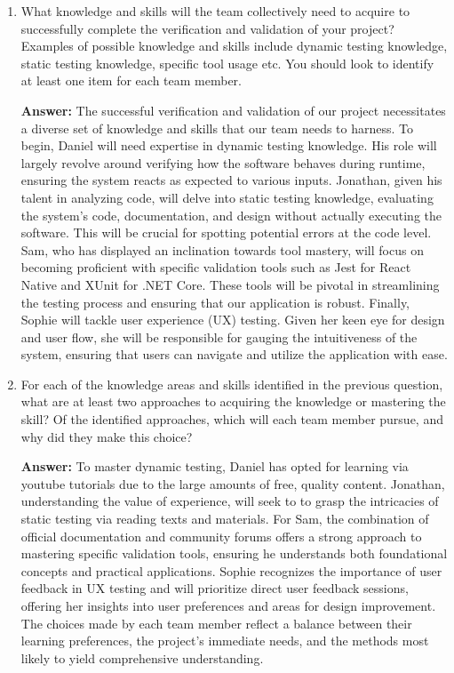 \documentclass[12pt, titlepage]{article}
\begin{document}
\begin{enumerate}
  \item What knowledge and skills will the team collectively need to acquire to successfully complete the verification and validation of your project? Examples of possible knowledge and skills include dynamic testing knowledge, static testing knowledge, specific tool usage etc. You should look to identify at least one item for each team member.

  \textbf{Answer:}
  The successful verification and validation of our project necessitates a diverse set of knowledge and skills that our team needs to harness. To begin, Daniel will need expertise in dynamic testing knowledge. His role will largely revolve around verifying how the software behaves during runtime, ensuring the system reacts as expected to various inputs. Jonathan, given his talent in analyzing code, will delve into static testing knowledge, evaluating the system's code, documentation, and design without actually executing the software. This will be crucial for spotting potential errors at the code level. Sam, who has displayed an inclination towards tool mastery, will focus on becoming proficient with specific validation tools such as Jest for React Native and XUnit for .NET Core. These tools will be pivotal in streamlining the testing process and ensuring that our application is robust. Finally, Sophie will tackle user experience (UX) testing. Given her keen eye for design and user flow, she will be responsible for gauging the intuitiveness of the system, ensuring that users can navigate and utilize the application with ease.

  \item For each of the knowledge areas and skills identified in the previous question, what are at least two approaches to acquiring the knowledge or mastering the skill? Of the identified approaches, which will each team member pursue, and why did they make this choice?

  \textbf{Answer:}
  To master dynamic testing, Daniel has opted for learning via youtube tutorials due to the large amounts of free, quality content. Jonathan, understanding the value of experience, will seek to to grasp the intricacies of static testing via reading texts and materials. For Sam, the combination of official documentation and community forums offers a strong approach to mastering specific validation tools, ensuring he understands both foundational concepts and practical applications. Sophie recognizes the importance of user feedback in UX testing and will prioritize direct user feedback sessions, offering her  insights into user preferences and areas for design improvement. The choices made by each team member reflect a balance between their learning preferences, the project's immediate needs, and the methods most likely to yield comprehensive understanding.
\end{enumerate}
\end{document}
